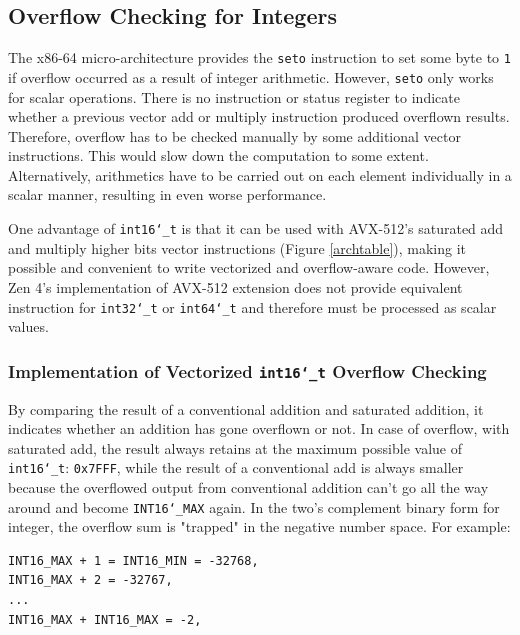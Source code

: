 \documentclass[logo,bsc,singlespacing,parskip]{infthesis}
\newcommand{\dtshort}{\texttt{int16\char`_t}}
\newcommand{\dtint}{\texttt{int32\char`_t}}
\newcommand{\dtlong}{\texttt{int64\char`_t}}
\begin{document}
\subsection{Overflow Checking for Integers}
\label{sec:overflow-int}

The x86-64 micro-architecture provides the \texttt{seto} instruction to set some
byte to \texttt{1} if overflow occurred as a result of integer arithmetic.
However, \texttt{seto} only works for scalar operations. There is no instruction
or status register to indicate whether a previous vector add or multiply
instruction produced overflown results. Therefore, overflow has to be
checked manually by some additional vector instructions. This would slow down
the computation to some extent. Alternatively, arithmetics have to be
carried out on each element individually in a scalar manner, resulting in even
worse performance. 



One advantage of \dtshort{} is that it can be used with AVX-512's
saturated add and multiply higher bits vector instructions (Figure
\ref{archtable}), making it possible and convenient to write vectorized and
overflow-aware code. However, Zen 4's implementation of AVX-512
extension does not provide equivalent instruction for \dtint{} or \dtlong{} and
therefore must be processed as scalar values.


\subsubsection{Implementation of Vectorized \dtshort{} Overflow Checking}
\label{sec:i16-overflow-checking}
By comparing the result of a conventional addition and saturated addition, it
indicates whether an addition has gone overflown or not. In case of overflow,
with saturated add, the result always retains at the maximum possible value of
\dtshort{}: \texttt{0x7FFF}, while the result of a conventional add is
always smaller because the overflowed output from conventional addition can't
go all the way around and become \texttt{INT16\char`_MAX} again. In the two's
complement binary form for integer, the overflow sum is "trapped" in the
negative number space. For example: 
\begin{verbatim}
INT16_MAX + 1 = INT16_MIN = -32768, 
INT16_MAX + 2 = -32767, 
...
INT16_MAX + INT16_MAX = -2, 
\end{verbatim}
\end{document}
